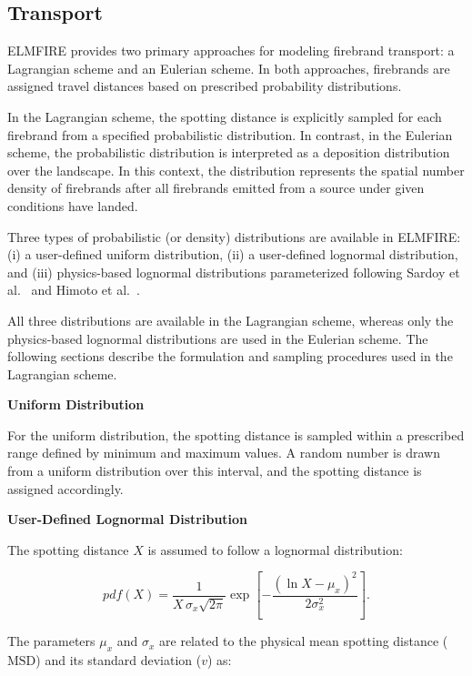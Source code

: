 \subsection{Transport}
\label{firebrand_transport}

ELMFIRE provides two primary approaches for modeling firebrand transport: a Lagrangian scheme and an Eulerian scheme. In both approaches, firebrands are assigned travel distances based on prescribed probability distributions.

In the Lagrangian scheme, the spotting distance is explicitly sampled for each firebrand from a specified probabilistic distribution. In contrast, in the Eulerian scheme, the probabilistic distribution is interpreted as a deposition distribution over the landscape. In this context, the distribution represents the spatial number density of firebrands after all firebrands emitted from a source under given conditions have landed.

Three types of probabilistic (or density) distributions are available in ELMFIRE:
(i) a user-defined uniform distribution,
(ii) a user-defined lognormal distribution, and
(iii) physics-based lognormal distributions parameterized following Sardoy et al.~\cite{sardoyNumericalStudyGroundlevel2008} and Himoto et al.~\cite{himotoTransportDiskshapedFirebrands2005}.

All three distributions are available in the Lagrangian scheme, whereas only the physics-based lognormal distributions are used in the Eulerian scheme. The following sections describe the formulation and sampling procedures used in the Lagrangian scheme.

\textbf{Uniform Distribution}

For the uniform distribution, the spotting distance is sampled within a prescribed range defined by minimum and maximum values. A random number is drawn from a uniform distribution over this interval, and the spotting distance is assigned accordingly.

\textbf{User-Defined Lognormal Distribution}
\label{math_lognormal}

The spotting distance $X$ is assumed to follow a lognormal distribution:

\[
pdf(X) = \frac{1}{X \, \sigma_x \sqrt{2\pi}} 
\exp\!\left[-\frac{(\ln X - \mu_x)^2}{2\sigma_x^2}\right].
\]

The parameters $\mu_x$ and $\sigma_x$ are related to the physical mean spotting distance ($\text{MSD}$) and its standard deviation ($v$) as:

